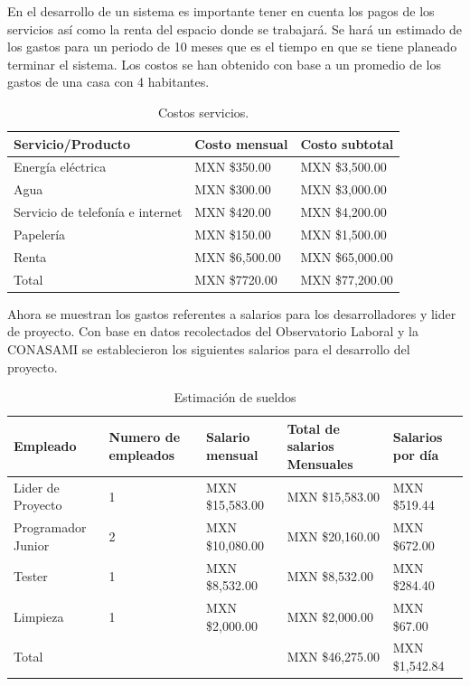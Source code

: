 \documentclass[12pt]{report}
\begin{document}
En el desarrollo de un sistema es importante tener en cuenta los pagos de los servicios así como la renta del espacio donde se trabajará. Se hará un estimado de los gastos para un periodo de 10 meses que es el tiempo en que se tiene planeado terminar el sistema. Los costos se han obtenido con base a un promedio de los gastos de una casa con 4 habitantes.
\begin{table}[H]
\begin{center}
\begin{tabular}{|p{40mm}|p{40mm}|p{40mm}|}
\hline
Servicio/Producto & Costo mensual & Costo subtotal \\
\hline \hline 
Energía eléctrica & MXN \$350.00 & MXN \$3,500.00\\
\hline
Agua & MXN \$300.00 & MXN \$3,000.00\\
\hline
Servicio de telefonía e internet & MXN \$420.00 & MXN \$4,200.00 \\
\hline
Papelería & MXN \$150.00 & MXN \$1,500.00\\
\hline
Renta & MXN \$6,500.00 & MXN \$65,000.00 \\
\hline \hline
Total & MXN \$7720.00 & MXN \$77,200.00\\
\hline
\end{tabular}
\caption{Costos servicios.}
\end{center}
\end{table}

Ahora se muestran los gastos referentes a salarios para los desarrolladores y lider de proyecto. Con base en datos recolectados del Observatorio Laboral y la CONASAMI se establecieron los siguientes salarios para el desarrollo del proyecto.

\begin{table}[H]
\begin{center}
\begin{tabular}{|p{30mm}|p{20mm}|p{30mm}|p{30mm}|p{30mm}|}
\hline
Empleado & Numero de empleados & Salario mensual & Total de salarios Mensuales & Salarios por día \\
\hline \hline
Lider de Proyecto & 1 & MXN \$15,583.00 & MXN \$15,583.00 & MXN \$519.44\\
\hline
Programador Junior & 2 & MXN \$10,080.00 & MXN \$20,160.00 & MXN \$672.00 \\
\hline
Tester & 1 & MXN \$8,532.00 & MXN \$8,532.00 &  MXN \$284.40 \\
\hline
Limpieza & 1 & MXN \$2,000.00 & MXN \$2,000.00 & MXN \$67.00 \\
\hline \hline
Total &  &  & MXN \$46,275.00 & MXN \$1,542.84 \\
\hline
\end{tabular}
\caption{Estimación de sueldos}
\end{center}
\end{table}
\end{document}
